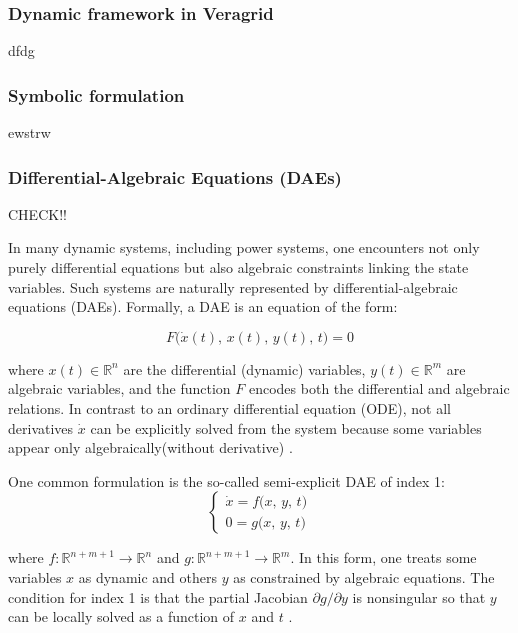 \subsubsection{Dynamic framework in Veragrid}

dfdg

\subsubsection{Symbolic formulation}

ewstrw

\subsubsection{Differential-Algebraic Equations (DAEs)}

CHECK!!

In many dynamic systems, including power systems, one encounters not only purely differential equations but also algebraic constraints linking the state
variables. Such systems are naturally represented by differential-algebraic equations (DAEs). Formally, a DAE is an equation of the form: 

\begin{equation}
  F\bigl(\dot{x}(t),\, x(t),\, y(t),\, t\bigr) = 0
\end{equation}


where $x(t)\in \mathbb{R}^n$ are the differential (dynamic) variables, $y(t)\in \mathbb{R}^m$ are algebraic variables, and the function
 $F$ encodes both the differential and algebraic relations. 
In contrast to an ordinary differential equation (ODE), not all derivatives \(\dot x\) can be explicitly solved from the system because some variables appear only 
algebraically(without derivative) \cite{PolitoDAE}.  

One common formulation is the so-called semi-explicit DAE of index 1:  
\begin{equation}
\begin{cases}
\dot x = f\bigl(x,\,y,\,t\bigr) \\
0 = g\bigl(x,\,y,\,t\bigr)
\end{cases}
\end{equation} 

where $f\colon \mathbb{R}^{n+m+1} \to \mathbb{R}^n$ and $g\colon \mathbb{R}^{n+m+1} \to \mathbb{R}^m$. In this form, one treats some variables $x$ as dynamic and others $y$
as constrained by algebraic equations. The condition for index 1 is that the partial Jacobian $\partial g / \partial y$ is nonsingular so that $y$ can be locally solved as
a function of $x$ and $t$ \cite{PolitoDAE}.  

